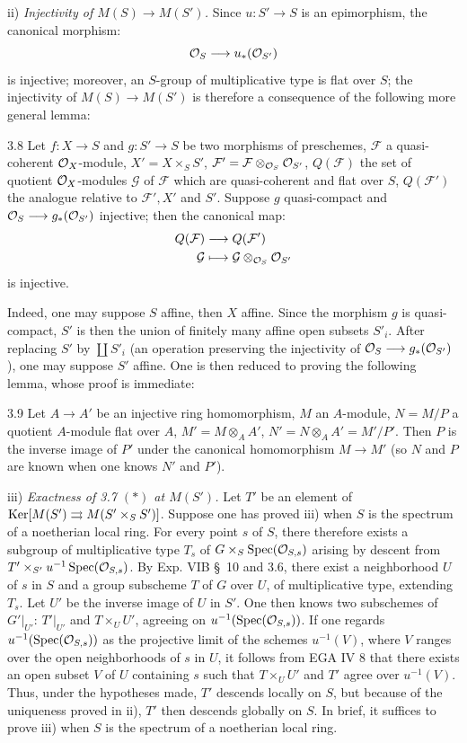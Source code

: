 \noindent ii) \emph{Injectivity of $M(S)\to M(S')$.} Since $u:S'\to S$ is an epimorphism, the canonical morphism:
\[
\mathcal{O}_S\longrightarrow u_*(\mathcal{O}_{S'})
\]
is injective; moreover, an $S$-group of multiplicative type is flat over $S$; the injectivity of $M(S)\to M(S')$ is therefore a consequence of the following more general lemma:
\begin{lemma}{3.8}\label{XV.3.8}
Let $f:X\to S$ and $g:S'\to S$ be two morphisms of preschemes, $\mathcal F$ a quasi-coherent $\mathcal{O}_X$-module, $X'=X\times_S S'$, $\mathcal F'=\mathcal F\otimes_{\mathcal{O}_S}\mathcal{O}_{S'}$, $Q(\mathcal F)$ the set of quotient $\mathcal{O}_X$-modules $\mathcal G$ of $\mathcal F$ which are quasi-coherent and flat over $S$, $Q(\mathcal F')$ the analogue relative to $\mathcal F',X'$ and $S'$. Suppose $g$ quasi-compact and $\mathcal{O}_S\longrightarrow g_*(\mathcal{O}_{S'})$ injective; then the canonical map:
\[
\begin{aligned}
Q(\mathcal F)&\longrightarrow Q(\mathcal F')\\
\mathcal G&\longmapsto\mathcal G\otimes_{\mathcal{O}_S}\mathcal{O}_{S'}
\end{aligned}
\]
is injective.
\end{lemma}
Indeed, one may suppose $S$ affine, then $X$ affine. Since the morphism $g$ is quasi-compact, $S'$ is then the union of finitely many affine open subsets $S'_i$. After replacing $S'$ by $\coprod S'_i$ (an operation preserving the injectivity of $\mathcal{O}_S\longrightarrow g_*(\mathcal{O}_{S'})$), one may suppose $S'$ affine. One is then reduced to proving the following lemma, whose proof is immediate:
\begin{lemma}{3.9}\label{XV.3.9}
Let $A\to A'$ be an injective ring homomorphism, $M$ an $A$-module, $N=M/P$ a quotient $A$-module flat over $A$, $M'=M\otimes_A A'$, $N'=N\otimes_A A'=M'/P'$. Then $P$ is the inverse image of $P'$ under the canonical homomorphism $M\to M'$ (so $N$ and $P$ are known when one knows $N'$ and $P'$).
\end{lemma}

\noindent iii) \emph{Exactness of 3.7 $(\ast)$ at $M(S')$.} Let $T'$ be an element of $\operatorname{Ker}[M(S')\rightrightarrows M(S'\times_S S')]$. Suppose one has proved iii) when $S$ is the spectrum of a noetherian local ring. For every point $s$ of $S$, there therefore exists a subgroup of multiplicative type $T_s$ of $G\times_S\operatorname{Spec}(\mathcal{O}_{S,s})$ arising by descent from $T'\times_{S'}u^{-1}\operatorname{Spec}(\mathcal{O}_{S,s})$. By Exp. VIB \S~10 and 3.6, there exist a neighborhood $U$ of $s$ in $S$ and a group subscheme $T$ of $G$ over $U$, of multiplicative type, extending $T_s$. Let $U'$ be the inverse image of $U$ in $S'$. One then knows two subschemes of $G'|_{U'}$: $T'|_{U'}$ and $T\times_U U'$, agreeing on $u^{-1}(\operatorname{Spec}(\mathcal{O}_{S,s}))$. If one regards $u^{-1}(\operatorname{Spec}(\mathcal{O}_{S,s}))$ as the projective limit of the schemes $u^{-1}(V)$, where $V$ ranges over the open neighborhoods of $s$ in $U$, it follows from EGA IV 8 that there exists an open subset $V$ of $U$ containing $s$ such that $T\times_U U'$ and $T'$ agree over $u^{-1}(V)$. Thus, under the hypotheses made, $T'$ descends locally on $S$, but because of the uniqueness proved in ii), $T'$ then descends globally on $S$. In brief, it suffices to prove iii) when $S$ is the spectrum of a noetherian local ring.

